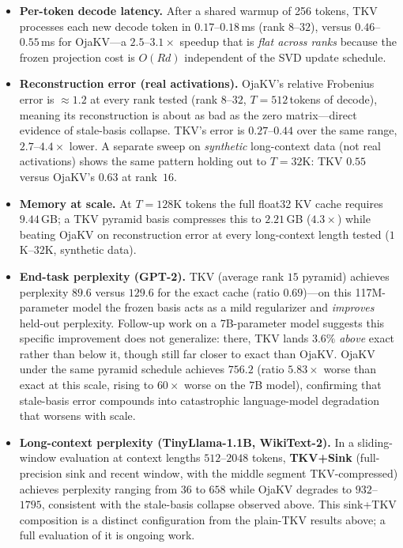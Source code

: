 \documentclass{article}
\begin{document}
\begin{itemize}[nosep,leftmargin=1.5em]
  \item \textbf{Per-token decode latency.}  After a shared warmup of 256 tokens,
    TKV processes each new decode token in $0.17$--$0.18$\,ms (rank $8$--$32$),
    versus $0.46$--$0.55$\,ms for OjaKV---a $2.5$--$3.1\times$ speedup that is
    \emph{flat across ranks} because the frozen projection cost is $O(Rd)$
    independent of the SVD update schedule.
  \item \textbf{Reconstruction error (real activations).}  OjaKV's relative
    Frobenius error is $\approx 1.2$ at every rank tested (rank $8$--$32$,
    $T{=}512$\,tokens of decode), meaning its reconstruction is about as bad as
    the zero matrix---direct evidence of stale-basis collapse.  TKV's error
    is $0.27$--$0.44$ over the same range, $2.7$--$4.4\times$ lower.  A separate
    sweep on \emph{synthetic} long-context data (not real activations) shows the
    same pattern holding out to $T{=}32$K: TKV $0.55$ versus OjaKV's $0.63$ at
    rank~$16$.
  \item \textbf{Memory at scale.}  At $T{=}128$K tokens the full float32 KV cache
    requires $9.44$\,GB; a TKV pyramid basis compresses this to $2.21$\,GB
    ($4.3\times$) while beating OjaKV on reconstruction error at every long-context
    length tested ($1$K--$32$K, synthetic data).
  \item \textbf{End-task perplexity (GPT-2).}  TKV (average rank $15$
    pyramid) achieves perplexity $89.6$ versus $129.6$ for the exact cache (ratio
    $0.69$)---on this 117M-parameter model the frozen basis acts as a mild
    regularizer and \emph{improves} held-out perplexity.  Follow-up work on a
    7B-parameter model suggests this specific improvement does not generalize:
    there, TKV lands $3.6\%$ \emph{above} exact rather than below it, though
    still far closer to exact than OjaKV.  OjaKV under the same pyramid schedule
    achieves $756.2$ (ratio $5.83\times$ worse than exact at this scale, rising
    to $60\times$ worse on the 7B model), confirming that stale-basis error
    compounds into catastrophic language-model degradation that worsens with
    scale.
  \item \textbf{Long-context perplexity (TinyLlama-1.1B, WikiText-2).}
    In a sliding-window evaluation at context lengths $512$--$2048$ tokens,
    \textbf{TKV+Sink} (full-precision sink and recent window, with the middle
    segment TKV-compressed) achieves perplexity ranging from $36$ to $658$
    while OjaKV degrades to $932$--$1795$, consistent with the stale-basis
    collapse observed above.  This sink+TKV composition is a distinct
    configuration from the plain-TKV results above; a full evaluation of it is
    ongoing work.
\end{itemize}
\end{document}
